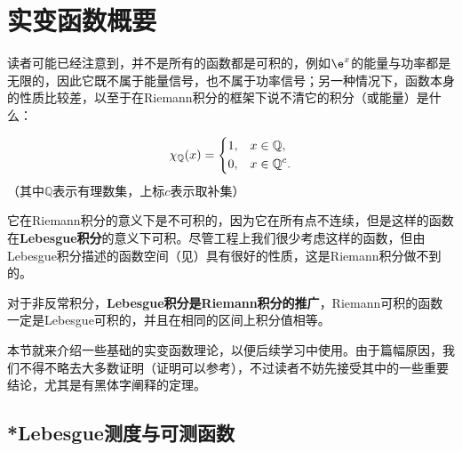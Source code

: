 \section{实变函数概要}\label{sec:Real_Analysis}

读者可能已经注意到，并不是所有的函数都是可积的，例如$\e^x$的能量与功率都是无限的，因此它既不属于能量信号，也不属于功率信号；另一种情况下，函数本身的性质比较差，以至于在Riemann积分的框架下说不清它的积分（或能量）是什么：
\begin{example}[Dirichlet函数]
    \begin{equation}
        \chi_{\mathbb{Q}}(x)=
        \begin{dcases}
            1, & x \in \mathbb{Q},    \\
            0, & x \in \mathbb{Q}^c.
        \end{dcases}
    \end{equation}
    （其中$\mathbb{Q}$表示有理数集，上标$c$表示取补集）
\end{example}
它在Riemann积分的意义下是不可积的，因为它在所有点不连续，但是这样的函数在\textbf{Lebesgue积分}的意义下可积。尽管工程上我们很少考虑这样的函数，但由Lebesgue积分描述的函数空间（见）具有很好的性质，这是Riemann积分做不到的。

对于非反常积分，\textbf{Lebesgue积分是Riemann积分的推广}，Riemann可积的函数一定是Lebesgue可积的，并且在相同的区间上积分值相等。

本节就来介绍一些基础的实变函数理论，以便后续学习中使用。由于篇幅原因，我们不得不略去大多数证明（证明可以参考\cite{real_analysis}），不过读者不妨先接受其中的一些重要结论，尤其是有黑体字阐释的定理。

\subsection{*Lebesgue测度与可测函数}\label{sub:lebesgue}

